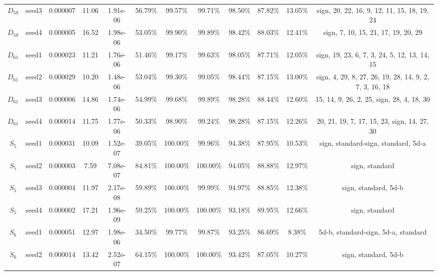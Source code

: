 \begin{tabular}{cccccccccccc}
 $D_{59}$ & seed3 &   0.000007 &     11.06 &  1.91e-06 &   56.79\% &   99.57\% &   99.71\% &   98.50\% & 87.82\% &            13.05\% &            sign, 20, 22, 16, 9, 12, 11, 15, 18, 19, 24 \\
 $D_{59}$ & seed4 &   0.000005 &     16.52 &  1.98e-06 &   53.05\% &   99.90\% &   99.89\% &   98.42\% & 88.03\% &            12.41\% &                    sign, 7, 10, 15, 21, 17, 19, 20, 29 \\
 $D_{61}$ & seed1 &   0.000023 &     11.21 &  1.76e-06 &   51.46\% &   99.17\% &   99.63\% &   98.05\% & 87.71\% &            12.05\% &           sign, 19, 23, 6, 7, 3, 24, 5, 12, 13, 14, 15 \\
 $D_{61}$ & seed2 &   0.000029 &     10.20 &  1.48e-06 &   53.04\% &   99.30\% &   99.05\% &   98.44\% & 87.15\% &            13.00\% & sign, 4, 29, 8, 27, 26, 19, 28, 14, 9, 2, 7, 3, 16, 18 \\
 $D_{61}$ & seed3 &   0.000006 &     14.86 &  1.74e-06 &   54.99\% &   99.68\% &   99.89\% &   98.28\% & 88.44\% &            12.60\% &              15, 14, 9, 26, 2, 25, sign, 28, 4, 18, 30 \\
 $D_{61}$ & seed4 &   0.000014 &     11.75 &  1.77e-06 &   50.33\% &   98.90\% &   99.24\% &   98.28\% & 87.15\% &            12.26\% &            20, 21, 19, 7, 17, 15, 23, sign, 14, 27, 30 \\
  $S_{5}$ & seed1 &   0.000031 &     10.09 &  1.52e-07 &   39.05\% &  100.00\% &   99.96\% &   94.38\% & 87.95\% &            10.53\% &                    sign, standard-sign, standard, 5d-a \\
  $S_{5}$ & seed2 &   0.000003 &      7.59 &  7.08e-07 &   84.81\% &  100.00\% &  100.00\% &   94.05\% & 88.88\% &            12.97\% &                                         sign, standard \\
  $S_{5}$ & seed3 &   0.000004 &     11.97 &  2.17e-08 &   59.89\% &  100.00\% &   99.99\% &   94.97\% & 88.85\% &            12.38\% &                                   sign, standard, 5d-b \\
  $S_{5}$ & seed4 &   0.000002 &     17.21 &  1.96e-09 &   59.25\% &  100.00\% &  100.00\% &   93.18\% & 89.95\% &            12.66\% &                                         sign, standard \\
  $S_{6}$ & seed1 &   0.000051 &     12.97 &  1.98e-06 &   34.50\% &   99.77\% &   99.87\% &   93.25\% & 86.69\% &             8.38\% &                    5d-b, standard-sign, 5d-a, standard \\
  $S_{6}$ & seed2 &   0.000014 &     13.42 &  2.52e-07 &   64.15\% &  100.00\% &  100.00\% &   93.42\% & 87.05\% &            10.27\% &                                   sign, standard, 5d-b \\

\end{tabular}

